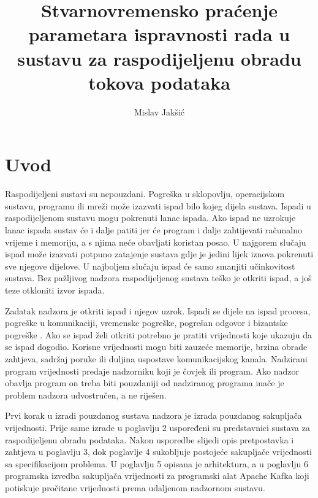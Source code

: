 \documentclass[utf8, diplomski, lmodern, numeric]{fer}
\begin{document}

\title{Stvarnovremensko praćenje parametara ispravnosti rada u sustavu za raspodijeljenu obradu tokova podataka}

\author{Mislav Jakšić}

\maketitle

\izvornik

\zahvala{}

\tableofcontents



\chapter{Uvod}

Raspodijeljeni sustavi su nepouzdani. Pogreška u sklopovlju, operacijskom sustavu, programu ili mreži može izazvati ispad bilo kojeg dijela sustava. Ispadi u raspodijeljenom sustavu mogu pokrenuti lanac ispada. Ako ispad ne uzrokuje lanac ispada sustav će i dalje patiti jer će program i dalje zahtijevati računalno vrijeme i memoriju, a s njima neće obavljati koristan posao. U najgorem slučaju ispad može izazvati potpuno zatajenje sustava gdje je jedini lijek iznova pokrenuti sve njegove dijelove. U najboljem slučaju ispad će samo smanjiti učinkovitost sustava. Bez pažljivog nadzora raspodijeljenog sustava teško je otkriti ispad, a još teze otkloniti izvor ispada.

Zadatak nadzora je otkriti ispad i njegov uzrok. Ispadi se dijele na ispad procesa, pogreške u komunikaciji, vremenske pogreške, pogrešan odgovor i bizantske pogreške \citep{rassus-manual}. Ako se ispad želi otkriti potrebno je pratiti vrijednosti koje ukazuju da se ispad dogodio. Korisne vrijednosti mogu biti zauzeće memorije, brzina obrade zahtjeva, sadržaj poruke ili duljina uspostave komunikacijskog kanala. Nadzirani program vrijednosti predaje nadzorniku koji je čovjek ili program. Ako nadzor obavlja program on treba biti pouzdaniji od nadziranog programa inače je problem nadzora udvostručen, a ne riješen.

Prvi korak u izradi pouzdanog sustava nadzora je izrada pouzdanog sakupljača vrijednosti. Prije same izrade u poglavlju 2 uspoređeni su predstavnici sustava za raspodijeljenu obradu podataka. Nakon usporedbe slijedi opis pretpostavka i zahtjeva u poglavlju 3, dok poglavlje 4 sukobljuje postojeće sakupljače vrijednosti sa specifikacijom problema. U poglavlju 5 opisana je arhitektura, a u poglavlju 6 programska izvedba sakupljača vrijednosti za programski alat Apache Kafka koji potiskuje pročitane vrijednosti prema udaljenom nadzornom sustavu.
\end{document}
